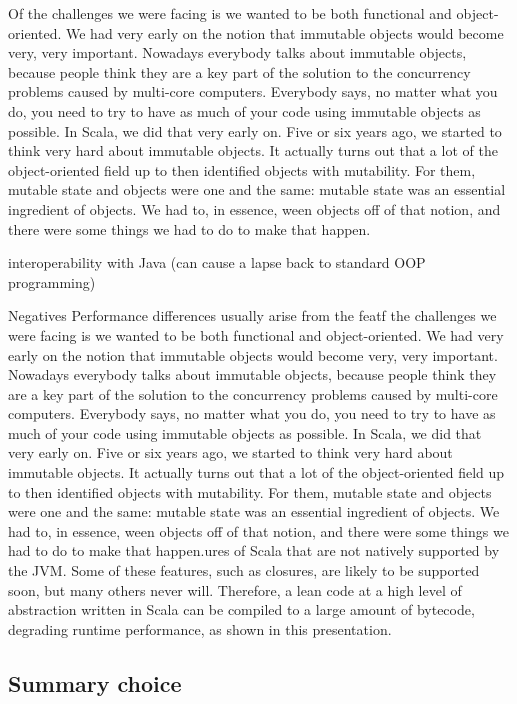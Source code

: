 \documentclass[main.tex]{subfiles}
\begin{document}
{{Of the challenges we were facing is we wanted to be both functional and object-oriented. We had very early on the notion that immutable objects would become very, very important. Nowadays everybody talks about immutable objects, because people think they are a key part of the solution to the concurrency problems caused by multi-core computers. Everybody says, no matter what you do, you need to try to have as much of your code using immutable objects as possible. In Scala, we did that very early on. Five or six years ago, we started to think very hard about immutable objects. It actually turns out that a lot of the object-oriented field up to then identified objects with mutability. For them, mutable state and objects were one and the same: mutable state was an essential ingredient of objects. We had to, in essence, ween objects off of that notion, and there were some things we had to do to make that happen.

interoperability with Java (can cause a lapse back to standard OOP programming)

Negatives
Performance differences usually arise from the featf the challenges we were facing is we wanted to be both functional and object-oriented. We had very early on the notion that immutable objects would become very, very important. Nowadays everybody talks about immutable objects, because people think they are a key part of the solution to the concurrency problems caused by multi-core computers. Everybody says, no matter what you do, you need to try to have as much of your code using immutable objects as possible. In Scala, we did that very early on. Five or six years ago, we started to think very hard about immutable objects. It actually turns out that a lot of the object-oriented field up to then identified objects with mutability. For them, mutable state and objects were one and the same: mutable state was an essential ingredient of objects. We had to, in essence, ween objects off of that notion, and there were some things we had to do to make that happen.ures of Scala that are not natively supported by the JVM. Some of these features, such as closures, are likely to be supported soon, but many others never will. Therefore, a lean code at a high level of abstraction written in Scala can be compiled to a large amount of bytecode, degrading runtime performance, as shown in this presentation.


\subsection{Summary choice}

}}
\end{document}
